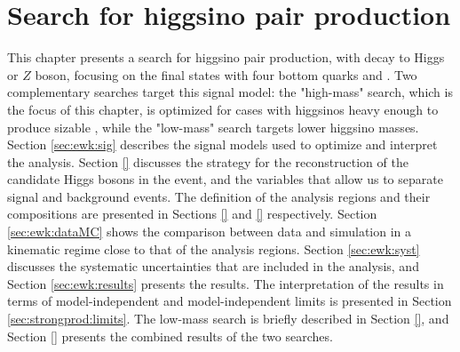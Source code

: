 \chapter{Search for higgsino pair production}
\label{chap:ewk_prod}

This chapter presents a search for higgsino pair production, with decay to Higgs or $Z$ boson, 
focusing on the final states with four bottom quarks and \met. 
Two complementary searches target this signal model: the "high-mass" search,
which is the focus of this chapter, is optimized for 
cases with higgsinos heavy enough to produce sizable \met, while the "low-mass" search 
targets lower higgsino masses.
Section \ref{sec:ewk:sig} describes the signal models used to optimize and interpret the analysis. 
Section \ref{} discusses the strategy for the reconstruction of the candidate Higgs bosons in the event, 
and the variables that allow us to separate signal and background events. 
The definition of the analysis regions and their compositions are presented in Sections \ref{} and 
\ref{} respectively. 
Section \ref{sec:ewk:dataMC} shows the comparison between data and simulation in a kinematic regime close to that of the analysis regions. 
Section \ref{sec:ewk:syst} discusses the systematic uncertainties that are included in the analysis, and Section \ref{sec:ewk:results} 
presents the results. 
The interpretation of the results in terms of model-independent and model-independent limits is presented in Section \ref{sec:strongprod:limits}. 
The low-mass search is briefly described in Section \ref{}, and Section \ref{} 
presents the combined results of the two searches. 








